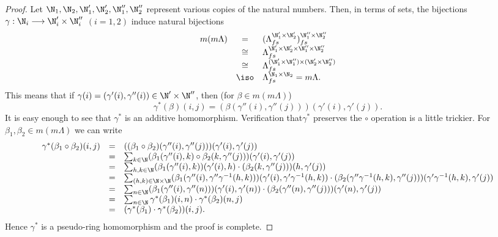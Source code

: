 \begin{proof}
Let $\N_1,\N_2,\N'_1,\N'_2,\N''_1,\N''_2$ represent various copies of the natural numbers. Then, in terms of sets, the bijections $\gamma: \N_i \longrightarrow \N'_i\times \N''_i$ $(i=1,2)$ induce natural bijections
\begin{equation*}
\begin{array}{rcl}
m(m\Lambda)& = &(\Lambda_{fs}^{\N'_1\times \N'_2})_{fs}^{\N''_1\times \N''_2} \\
 & \cong & \Lambda_{fs}^{\N'_1\times \N'_2\times \N''_1\times \N''_2}\\
& \cong &\Lambda_{fs}^{(\N'_1\times \N''_1)\times (\N'_2\times \N''_2)} \\
&\iso &\Lambda_{fs}^{\N_1\times \N_2}=m\Lambda.
\end{array}
\end{equation*}
This means that if $\gamma(i)=(\gamma'(i),\gamma''(i))\in \N'\times \N''$, then (for $\beta\in m(m\Lambda)$)
\[\gamma^*(\beta)(i,j)=(\beta(\gamma''(i),\gamma''(j)))(\gamma'(i),\gamma'(j)).\]
It is easy enough to see that $\gamma^*$ is an additive homomorphism. Verification  that$\gamma^*$ preserves the $\circ$ operation is a little trickier. For $\beta_1,\beta_2\in m(m\Lambda)$ we can write
\begin{equation*}
\begin{array}{rcl}
\gamma^*(\beta_1\circ \beta_2)(i,j)&=&((\beta_1\circ \beta_2)(\gamma''(i),\gamma''(j)))(\gamma'(i),\gamma'(j))\\
&=&\sum_{k\in \N}(\beta_1(\gamma''(i),k)\circ \beta_2(k,\gamma''(j)))(\gamma'(i),\gamma'(j))\\
&=&\sum_{h,k\in \N}(\beta_1(\gamma''(i),k))(\gamma'(i),h)\cdot (\beta_2(k,\gamma''(j)))(h,\gamma'(j))\\
&=&\sum_{(h,k)\in \N\times \N}(\beta_1(\gamma''(i),\gamma''\gamma^{-1}(h,k)))(\gamma'(i),\gamma'\gamma^{-1}(h,k))\cdot (\beta_2(\gamma''\gamma^{-1}(h,k),\gamma''(j)))(\gamma'\gamma^{-1}(h,k),\gamma'(j))\\
&=&\sum_{n\in \N}(\beta_1(\gamma''(i),\gamma''(n)))(\gamma'(i),\gamma'(n))\cdot (\beta_2(\gamma''(n),\gamma''(j)))(\gamma'(n),\gamma'(j))\\
&=&\sum_{n\in \N}\gamma^*(\beta_1)(i,n)\cdot \gamma^*(\beta_2)(n,j)\\
&=&(\gamma^*(\beta_1)\cdot \gamma^*(\beta_2))(i,j).\\
\end{array}
\end{equation*}
Hence $\gamma^*$ is a pseudo-ring homomorphism and the proof is complete.

\end{proof}

